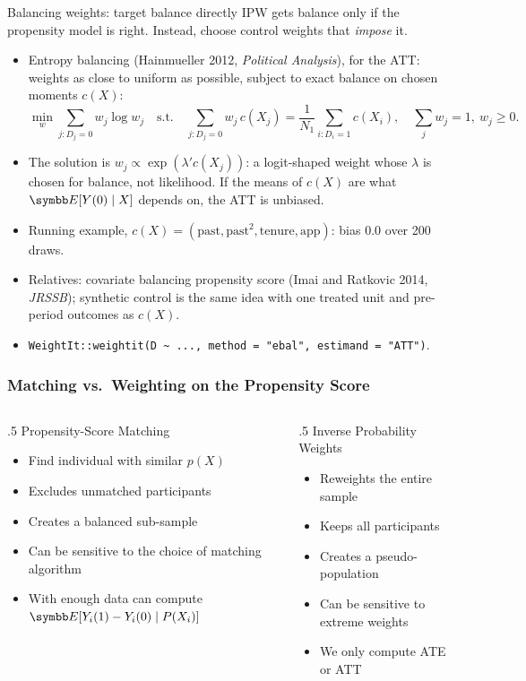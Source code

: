 \documentclass[aspectratio=169,11pt]{beamer}
\begin{document}
\begin{frame}{Balancing weights: target balance directly}
\small
IPW gets balance only if the propensity model is right. Instead, choose control weights that \emph{impose} it.
\begin{itemize}
\item \alert{Entropy balancing} (Hainmueller 2012, \emph{Political Analysis}), for the ATT: weights as close to
uniform as possible, subject to exact balance on chosen moments $c(X)$:
\[
\min_{w} \sum_{j: D_j = 0} w_j \log w_j \quad \text{s.t.} \quad \sum_{j: D_j=0} w_j\, c(X_j) = \frac{1}{N_1}\sum_{i: D_i=1} c(X_i),
\quad \sum_j w_j = 1,\ w_j \ge 0 .
\]
\item The solution is $w_j \propto \exp(\lambda' c(X_j))$: a logit-shaped weight whose $\lambda$ is chosen for
balance, not likelihood. If the means of $c(X)$ are what $\E[Y(0) \mid X]$ depends on, the ATT is unbiased.
\item Running example, $c(X) = (\text{past}, \text{past}^2, \text{tenure}, \text{app})$: bias $0.0$ over 200 draws.
\item Relatives: covariate balancing propensity score (Imai and Ratkovic 2014, \emph{JRSSB}); synthetic control is
the same idea with one treated unit and pre-period outcomes as $c(X)$.
\item \texttt{WeightIt::weightit(D \textasciitilde{} ..., method = "ebal", estimand = "ATT")}.
\end{itemize}
\end{frame}


\begin{frame}
\frametitle{Matching vs.\ Weighting on the Propensity Score}
\begin{columns}
\begin{column}{.5\textwidth}
Propensity-Score Matching
\begin{itemize}
	\item Find individual with similar $p(X)$
	\item Excludes unmatched participants
	\item Creates a balanced \alert{sub-sample}
	\item Can be sensitive to the choice of matching algorithm
	\item With enough data can compute $\E[Y_i(1)-Y_i(0) \mid P(X_i)]$
\end{itemize}
\end{column}
\begin{column}{.5\textwidth}
Inverse Probability Weights
\begin{itemize}
	\item Reweights the entire sample
	\item Keeps all participants
	\item Creates a pseudo-population
	\item Can be sensitive to extreme weights
	\item We only compute ATE or ATT
\end{itemize}
\end{column}
\end{columns}
\end{frame}
\end{document}
